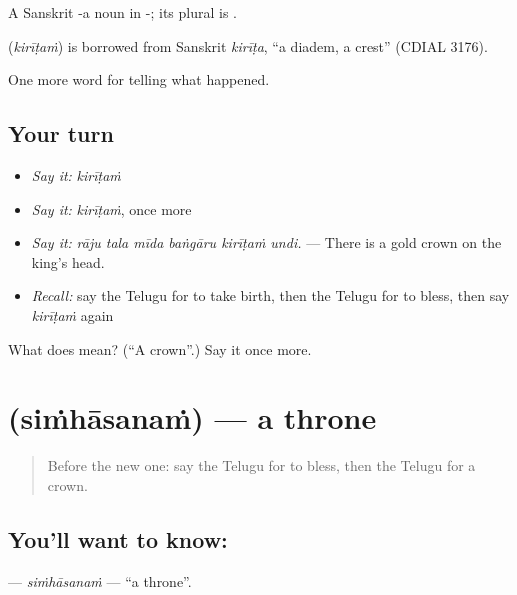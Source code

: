 A Sanskrit -a noun in -; its plural is .

\begin{cousinweb}
\textbf{} (\emph{kirīṭaṁ}) is borrowed from Sanskrit \emph{kirīṭa}, \textquotedblleft{}a diadem, a crest\textquotedblright{} (CDIAL 3176).
\end{cousinweb}

\begin{grammarlens}[title={What you've built}]
One more word for telling what happened.
\end{grammarlens}

\subsection*{Your turn}
\begin{itemize}
\raggedright
  \item \emph{Say it:} \emph{kirīṭaṁ}
  \item \emph{Say it:} \emph{kirīṭaṁ}, once more
  \item \emph{Say it:} \emph{rāju tala mīda baṅgāru kirīṭaṁ undi.} — There is a gold crown on the king's head.
  \item \emph{Recall:} say the Telugu for to take birth, then the Telugu for to bless, then say \emph{kirīṭaṁ} again
\end{itemize}

\begin{tcolorbox}[breakable,colback=teal!4,colframe=teal!35!black,title={Before you move on}]
What does  mean? (\textquotedblleft{}A crown\textquotedblright{}.) Say it once more.
\end{tcolorbox}
\section[\texorpdfstring{\te{సింహాసనం} (siṁhāsanaṁ)}{సింహాసనం (siṁhāsanaṁ)}]{ (siṁhāsanaṁ) — a throne}

\label{lesson:TE-C335-simhasanam}



\begin{quote}
Before the new one: say the Telugu for to bless, then the Telugu for a crown.
\end{quote}

\subsection*{You'll want to know: }
\textbf{} — \emph{siṁhāsanaṁ} — \textquotedblleft{}a throne\textquotedblright{}.

